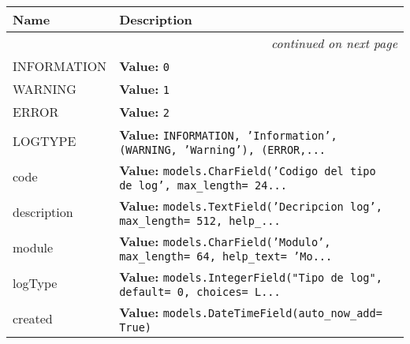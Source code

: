     \vspace{-1cm}
\hspace{\varindent}\begin{longtable}{|p{\varnamewidth}|p{\vardescrwidth}|l}
\cline{1-2}
\cline{1-2} \centering \textbf{Name} & \centering \textbf{Description}& \\
\cline{1-2}
\endhead\cline{1-2}\multicolumn{3}{r}{\small\textit{continued on next page}}\\\endfoot\cline{1-2}
\endlastfoot\raggedright I\-N\-F\-O\-R\-M\-A\-T\-I\-O\-N\- & \raggedright \textbf{Value:} 
{\tt 0}&\\
\cline{1-2}
\raggedright W\-A\-R\-N\-I\-N\-G\- & \raggedright \textbf{Value:} 
{\tt 1}&\\
\cline{1-2}
\raggedright E\-R\-R\-O\-R\- & \raggedright \textbf{Value:} 
{\tt 2}&\\
\cline{1-2}
\raggedright L\-O\-G\-T\-Y\-P\-E\- & \raggedright \textbf{Value:} 
{\tt INFORMATION, 'Information', (WARNING, 'Warning'), (ERROR,\texttt{...}}&\\
\cline{1-2}
\raggedright c\-o\-d\-e\- & \raggedright \textbf{Value:} 
{\tt models.CharField('Codigo del tipo de log', max\_length= 24\texttt{...}}&\\
\cline{1-2}
\raggedright d\-e\-s\-c\-r\-i\-p\-t\-i\-o\-n\- & \raggedright \textbf{Value:} 
{\tt models.TextField('Decripcion log', max\_length= 512, help\_\texttt{...}}&\\
\cline{1-2}
\raggedright m\-o\-d\-u\-l\-e\- & \raggedright \textbf{Value:} 
{\tt models.CharField('Modulo', max\_length= 64, help\_text= 'Mo\texttt{...}}&\\
\cline{1-2}
\raggedright l\-o\-g\-T\-y\-p\-e\- & \raggedright \textbf{Value:} 
{\tt models.IntegerField("Tipo de log", default= 0, choices= L\texttt{...}}&\\
\cline{1-2}
\raggedright c\-r\-e\-a\-t\-e\-d\- & \raggedright \textbf{Value:} 
{\tt models.DateTimeField(auto\_now\_add= True)}&\\
\cline{1-2}
\end{longtable}

